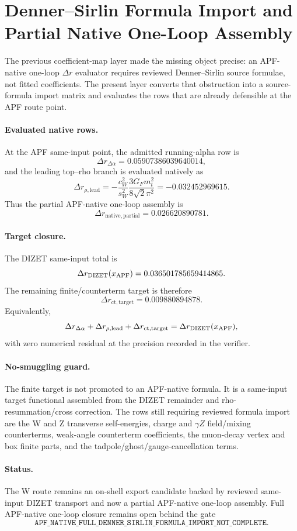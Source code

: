 
\section{Denner--Sirlin Formula Import and Partial Native One-Loop Assembly}\label{sec:wtrace-v19-denner-import}

The previous coefficient-map layer made the missing object precise: an APF-native one-loop \(\Delta r\) evaluator requires reviewed Denner--Sirlin source formulae, not fitted coefficients.  The present layer converts that obstruction into a source-formula import matrix and evaluates the rows that are already defensible at the APF route point.

\paragraph{Evaluated native rows.}
At the APF same-input point, the admitted running-alpha row is
\[
\Delta r_{\Delta\alpha}=0.05907386039640014,
\]
and the leading top--rho branch is evaluated natively as
\[
\Delta r_{\rho,\mathrm{lead}}
=-\frac{c_W^2}{s_W^2}\frac{3G_Fm_t^2}{8\sqrt{2}\pi^2}
=-0.032452969615.
\]
Thus the partial APF-native one-loop assembly is
\[
\Delta r_{\mathrm{native,partial}}
=0.026620890781.
\]

\paragraph{Target closure.}
The DIZET same-input total is
\[
\Delta r_{\mathrm{DIZET}}(x_{\rm APF})=0.036501785659414865.
\]
The remaining finite/counterterm target is therefore
\[
\Delta r_{\mathrm{ct,target}}=0.009880894878.
\]
Equivalently,
\[
\Delta r_{\Delta\alpha}
+\Delta r_{\rho,\mathrm{lead}}
+\Delta r_{\mathrm{ct,target}}
=\Delta r_{\mathrm{DIZET}}(x_{\rm APF}),
\]
with zero numerical residual at the precision recorded in the verifier.

\paragraph{No-smuggling guard.}
The finite target is not promoted to an APF-native formula.  It is a same-input target functional assembled from the DIZET remainder and rho-resummation/cross correction.  The rows still requiring reviewed formula import are the W and Z transverse self-energies, charge and \(\gamma Z\) field/mixing counterterms, weak-angle counterterm coefficients, the muon-decay vertex and box finite parts, and the tadpole/ghost/gauge-cancellation terms.

\paragraph{Status.}
The W route remains an on-shell export candidate backed by reviewed same-input DIZET transport and now a partial APF-native one-loop assembly.  Full APF-native one-loop closure remains open behind the gate
\[
\boxed{\texttt{APF\_NATIVE\_FULL\_DENNER\_SIRLIN\_FORMULA\_IMPORT\_NOT\_COMPLETE}}.
\]
